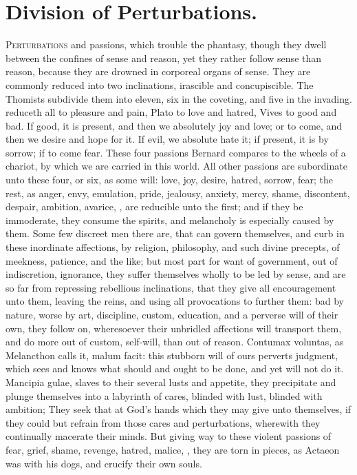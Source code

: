 {%
\section{Division of Perturbations.}

\lettrine{P}{erturbations} and passions, which trouble the phantasy, though they
dwell between the confines of sense and reason, yet they rather follow
sense than reason, because they are drowned in corporeal organs of
sense. They are commonly reduced into two inclinations, irascible
and concupiscible. The Thomists subdivide them into eleven, six in the
coveting, and five in the invading. \Aristotle reduceth all to pleasure
and pain, Plato to love and hatred, Vives to good and bad. If
good, it is present, and then we absolutely joy and love; or to come,
and then we desire and hope for it. If evil, we absolute hate it; if
present, it is by sorrow; if to come fear. These four passions
Bernard compares to the wheels of a chariot, by which we are
carried in this world. All other passions are subordinate unto these
four, or six, as some will: love, joy, desire, hatred, sorrow, fear;
the rest, as anger, envy, emulation, pride, jealousy, anxiety, mercy,
shame, discontent, despair, ambition, avarice, \etc{}, are reducible unto
the first; and if they be immoderate, they consume the spirits,
and melancholy is especially caused by them. Some few discreet men
there are, that can govern themselves, and curb in these inordinate
affections, by religion, philosophy, and such divine precepts, of
meekness, patience, and the like; but most part for want of government,
out of indiscretion, ignorance, they suffer themselves wholly to be led
by sense, and are so far from repressing rebellious inclinations, that
they give all encouragement unto them, leaving the reins, and using all
provocations to further them: bad by nature, worse by art, discipline,
custom, education, and a perverse will of their own, they follow
on, wheresoever their unbridled affections will transport them, and do
more out of custom, self-will, than out of reason. Contumax voluntas,
as Melancthon calls it, malum facit: this stubborn will of ours
perverts judgment, which sees and knows what should and ought to be
done, and yet will not do it. Mancipia gulae, slaves to their several
lusts and appetite, they precipitate and plunge themselves into a
labyrinth of cares, blinded with lust, blinded with ambition;
They seek that at God's hands which they may give unto
themselves, if they could but refrain from those cares and
perturbations, wherewith they continually macerate their minds. But
giving way to these violent passions of fear, grief, shame, revenge,
hatred, malice, \etc{}, they are torn in pieces, as Actaeon was with his
dogs, and crucify their own souls.

}
